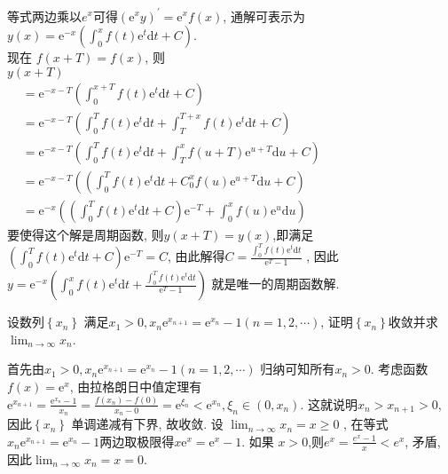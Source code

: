 \documentclass[kindlepaper]{BHCexam4kindle}
\begin{document}
\begin{questions}

		\begin{solution}
			等式两边乘以$e^{x}$可得$\left(\mathrm{e}^{x} y\right)^{\prime}=\mathrm{e}^{x} f(x)$, 
			通解可表示为$y(x)=\mathrm{e}^{-x}\left(\int_{0}^{x} f(t) \mathrm{e}^{t} \mathrm{d} t+C\right)$.\\
			现在 $f(x+T)=f(x)$, 则\\$y(x+T)$\\
		$\begin{aligned} &=\mathrm{e}^{-x-T}\left(\int_{0}^{x+T} f(t) \mathrm{e}^{t} \mathrm{d} t+C\right) \\ &=\mathrm{e}^{-x-T}\left(\int_{0}^{T} f(t) \mathrm{e}^{t} \mathrm{d} t+\int_{T}^{T+x} f(t) \mathrm{e}^{t} \mathrm{d} t+C\right) \\ &=\mathrm{e}^{-x-T}\left(\int_{0}^{T} f(t) \mathrm{e}^{t} \mathrm{d} t+\int_{T}^{x} f(u+T) \mathrm{e}^{u+T} \mathrm{d} u+C\right) \\ &=\mathrm{e}^{-x-T}\left(\left(\int_{0}^{T} f(t) \mathrm{e}^{t} \mathrm{d} t+C_{0}^{x} f(u) \mathrm{e}^{u+T} \mathrm{d} u+C\right)\right.\\ &=\mathrm{e}^{-x}\left(\left(\int_{0}^{T} f(t) \mathrm{e}^{t} \mathrm{d} t+C\right) \mathrm{e}^{-T}+\int_{0}^{x} f(u) \mathrm{e}^{u} \mathrm{d} u\right) \end{aligned}$
					\\要使得这个解是周期函数, 则$y(x+T)=y(x)$,即满足$\left(\int_{0}^{T} f(t) \mathrm{e}^{t} \mathrm{d} t+C\right) \mathrm{e}^{-T}=C$,
			由此解得$C=\frac{\int_{0}^{T} f(t) \mathrm{e}^{t} \mathrm{d} t}{\mathrm{e}^{T}-1}$
			, 因此$y=\mathrm{e}^{-x}\left(\int_{0}^{x} f(t) \mathrm{e}^{t} \mathrm{d} t+\frac{\int_{0}^{T} f(t) \mathrm{e}^{t} \mathrm{d} t}{\mathrm{e}^{T}-1}\right)$
			就是唯一的周期函数解.
		\end{solution}

		\qs 设数列$\left\{x_{n}\right\}$ 满足$x_{1}>0, x_{n} \mathrm{e}^{x_{n+1}}=\mathrm{e}^{x_{n}}-1(n=1,2, \cdots)$,
		证明$\left\{x_{n}\right\}$收敛并求$\lim _{n \rightarrow \infty} x_{n}$.
		\begin{solution}
			首先由$x_{1}>0, x_{n} \mathrm{e}^{x_{n+1}}=\mathrm{e}^{x_{n}}-1(n=1,2, \cdots)$
			归纳可知所有$x_{n}>0$. 考虑函数$f(x)=\mathrm{e}^{x}$, 由拉格朗日中值定理有\\
			$\mathrm{e}^{x_{n+1}}=\frac{\mathrm{e}^{x_{n}}-1}{x_{n}}=\frac{f\left(x_{n}\right)-f(0)}{x_{n}-0}=\mathrm{e}^{\xi_{n}}<\mathrm{e}^{x_{n}}, \xi_{n} \in\left(0, x_{n}\right)$.
			这就说明$x_{n}>x_{n+1}>0$, 因此$\left\{x_{n}\right\}$ 单调递减有下界, 故收敛. 设 $\lim _{n \rightarrow \infty} x_{n}=x \geqslant 0$
			, 在等式$x_{n} \mathrm{e}^{x_{n+1}}=\mathrm{e}^{x_{n}}-1$两边取极限得$x \mathrm{e}^{x}=\mathrm{e}^{x}-1$. 如果
			$x>0$,则$e^{x}=\frac{e^{x}-1}{x}<e^{x}$, 矛盾, 因此$\lim _{n \rightarrow \infty} x_{n}=x=0$.
		\end{solution}


\end{questions}
\end{document}
